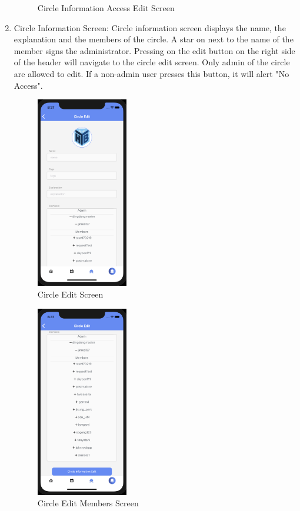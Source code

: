 \documentclass[conference]{IEEEtran}
\begin{document}
\begin{enumerate}
\begin{figure}[h]
        \caption{Circle Information Access Edit Screen}
        \label{fig:my_label}
    \end{figure}
    \item Circle Information Screen: Circle information screen displays the name, the explanation and the members of the circle. A star on next to the name of the member signs the administrator. Pressing on the edit button on the right side of the header will navigate to the circle edit screen. Only admin of the circle are allowed to edit. If a non-admin user presses this button, it will alert "No Access".
    \begin{figure}[h]
        \centering
        \includegraphics[width=4cm]{images/circleedit1.png}
        \caption{Circle Edit Screen}
        \label{fig:my_label}
    \end{figure}
    \begin{figure}[h]
        \centering
        \includegraphics[width=4cm]{images/circleedit2.png}
        \caption{Circle Edit Members Screen}

\end{figure}
\end{enumerate}
\end{document}
